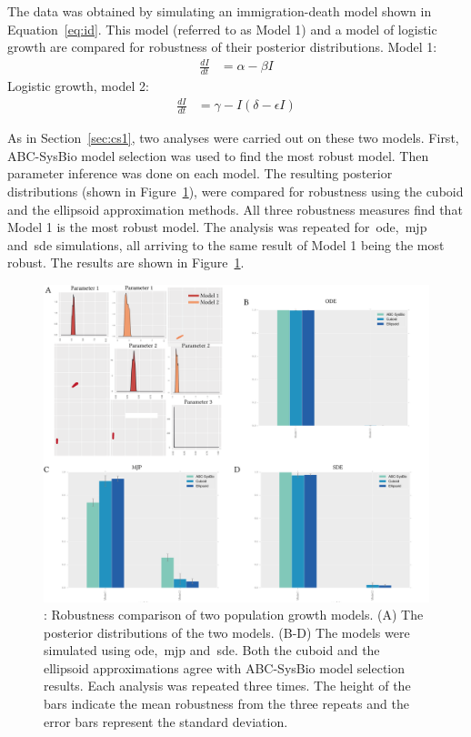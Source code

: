 The data was obtained by simulating an immigration-death model shown in Equation~\ref{eq:id}. This model (referred to as Model 1) and a model of logistic growth are compared for robustness of their posterior distributions. 
Model 1:
\begin{align}
  \frac{dI}{dt} &= \alpha - \beta I \label{eq:id}
\end{align}
Logistic growth, model 2:
\begin{align}
  \frac{dI}{dt} &= \gamma - I	(\delta - \epsilon I)
\end{align}


As in Section~\ref{sec:cs1}, two analyses were carried out on these two models. First, ABC-SysBio model selection was used to find the most robust model. Then parameter inference was done on each model. The resulting posterior distributions (shown in Figure~\ref{fig:rob_sysbio4}), were compared for robustness using the cuboid and the ellipsoid approximation methods. All three robustness measures find that Model 1 is the most robust model. The analysis was repeated for~\acrshort{ode},~\acrshort{mjp} and~\acrshort{sde} simulations, all arriving to the same result of Model 1 being the most robust. The results are shown in Figure~\ref{fig:rob_sysbio4}.


\begin{figure}[p]
\begin{center}
\includegraphics[width=\textwidth]{../../chapters/chapterStabilityFinder/images/ex4_summ.png}
\caption[LoF caption]{\label{fig:rob_sysbio4}: Robustness comparison of two population growth models. (A) The posterior distributions of the two models. (B-D) The models were simulated using \acrshort{ode},~\acrshort{mjp} and~\acrshort{sde}. Both the cuboid and the ellipsoid approximations agree with ABC-SysBio model selection results. Each analysis was repeated three times. The height of the bars indicate the mean robustness from the three repeats and the error bars represent the standard deviation. }
\end{center}
\end{figure}


